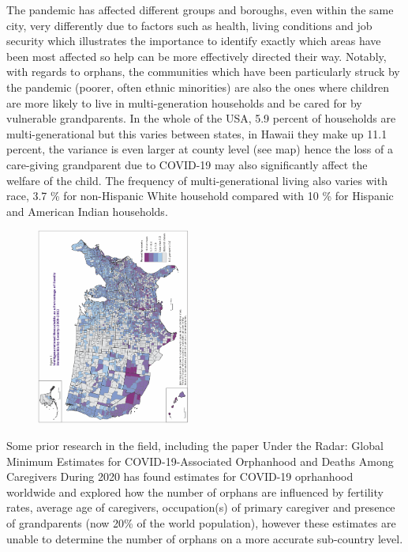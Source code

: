 \documentclass[11pt]{article}
\begin{document}
The pandemic has affected different groups and boroughs, even within the same city, very differently due to factors such as health, living conditions and job security\cite{triangle} which illustrates the importance to identify exactly which areas have been most affected so help can be more effectively directed their way. Notably, with regards to orphans, the communities which have been particularly struck by the pandemic (poorer, often ethnic minorities) are also the ones where children are more likely to live in multi-generation households and be cared for by vulnerable grandparents. In the whole of the USA, 5.9 percent of households are multi-generational but this varies between states, in Hawaii they make up 11.1 percent, the variance is even larger at county level (see map) hence the loss of a care-giving grandparent due to COVID-19 may also significantly affect the welfare of the child. The frequency of multi-generational living also varies with race, 3.7 \% for non-Hispanic White household compared with 10 \% for Hispanic and American Indian households\cite{housing}.

\begin{figure}[H]
\vspace{20pt}
\includegraphics[width=0.45\textwidth, angle = 270]{ImageResults/Households.png}
\centering
{}
\end{figure}

 
Some prior research in the field, including the paper Under the Radar: Global Minimum Estimates for COVID-19-Associated Orphanhood and Deaths Among Caregivers During 2020\cite{global_study} has found estimates for COVID-19 oprhanhood worldwide and explored how the number of orphans are influenced by fertility rates, average age of caregivers, occupation(s) of primary caregiver and presence of grandparents (now 20\% of the world population\cite{grandparents}), however these estimates are unable to determine the number of orphans on a more accurate sub-country level.
\end{document}
